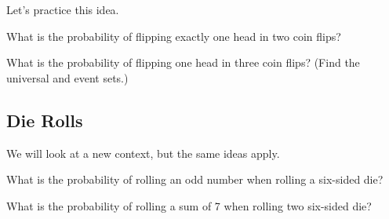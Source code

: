 \noindent Let's practice this idea.

\begin{exercise}
What is the probability of flipping exactly one head in two coin flips?
\end{exercise}

\vspace{1in}

\begin{exercise}
What is the probability of flipping one head in three coin flips? (Find the universal and event sets.)
\end{exercise}

\vspace{1.5in}

\subsection{Die Rolls}
We will look at a new context, but the same ideas apply.

\begin{exercise}
What is the probability of rolling an odd number when rolling a six-sided die?
\end{exercise}

\vspace{1.5in}

\begin{exercise}
What is the probability of rolling a sum of 7 when rolling two six-sided die?
\end{exercise}

\vspace{1.5in}